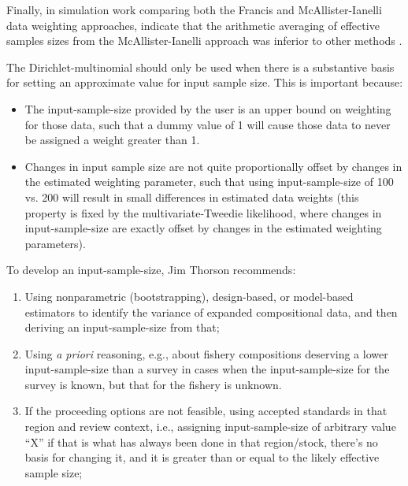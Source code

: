 Finally, in simulation work comparing both the Francis and McAllister-Ianelli data weighting approaches, indicate that the arithmetic averaging of effective samples sizes from the McAllister-Ianelli approach was inferior to other methods \citep{punt_insights_2016}.

\hypertarget{DM}{}
The Dirichlet-multinomial should only be used when there is a
substantive basis for setting an approximate value for input sample
size. This is important because: 

\begin{itemize}
	\item The input-sample-size provided by the user is an upper bound on
	weighting for those data, such that a dummy value of 1 will cause those
	data to never be assigned a weight greater than 1.
	\item Changes in input sample size are not quite proportionally
	offset by changes in the estimated weighting parameter, such that
	using input-sample-size of 100 vs. 200 will result in small differences
	in estimated data weights (this property is fixed by the
	multivariate-Tweedie likelihood, where changes in input-sample-size are
	exactly offset by changes in the estimated weighting parameters).   
\end{itemize}

To develop an input-sample-size, Jim Thorson recommends:

\begin{enumerate}
	\item Using nonparametric (bootstrapping), design-based, or model-based
	estimators to identify the variance of expanded compositional data, and
	then deriving an input-sample-size from that; 
	\item Using \textit{a priori} reasoning, e.g., about fishery compositions
	deserving a lower input-sample-size than a survey in cases when the
	input-sample-size for the survey is known, but that for the fishery is
	unknown. 
	\item If the proceeding options are not feasible, using accepted
	standards in that region and review context, i.e., assigning
	input-sample-size of arbitrary value ``X'' if that is what has always been
	done in that region/stock, there's no basis for changing it, and it is
	greater than or equal to the likely effective sample size; 
\end{enumerate}


